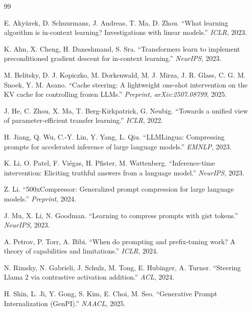 \documentclass[11pt]{article}
\theoremstyle{definition}
\begin{document}

\begin{thebibliography}{99}

E. Akyürek, D. Schuurmans, J. Andreas, T. Ma, D. Zhou.
``What learning algorithm is in-context learning? Investigations with linear models.''
\emph{ICLR}, 2023.

K. Ahn, X. Cheng, H. Daneshmand, S. Sra.
``Transformers learn to implement preconditioned gradient descent for in-context learning.''
\emph{NeurIPS}, 2023.

M. Belitsky, D. J. Kopiczko, M. Dorkenwald, M. J. Mirza, J. R. Glass, C. G. M. Snoek, Y. M. Asano.
``Cache steering: A lightweight one-shot intervention on the KV cache for controlling frozen LLMs.''
\emph{Preprint, arXiv:2507.08799}, 2025.

J. He, C. Zhou, X. Ma, T. Berg-Kirkpatrick, G. Neubig.
``Towards a unified view of parameter-efficient transfer learning.''
\emph{ICLR}, 2022.

H. Jiang, Q. Wu, C.-Y. Lin, Y. Yang, L. Qiu.
``LLMLingua: Compressing prompts for accelerated inference of large language models.''
\emph{EMNLP}, 2023.

K. Li, O. Patel, F. Viégas, H. Pfister, M. Wattenberg.
``Inference-time intervention: Eliciting truthful answers from a language model.''
\emph{NeurIPS}, 2023.

Z. Li.
``500xCompressor: Generalized prompt compression for large language models.''
\emph{Preprint}, 2024.

J. Mu, X. Li, N. Goodman.
``Learning to compress prompts with gist tokens.''
\emph{NeurIPS}, 2023.

A. Petrov, P. Torr, A. Bibi.
``When do prompting and prefix-tuning work? A theory of capabilities and limitations.''
\emph{ICLR}, 2024.

N. Rimsky, N. Gabrieli, J. Schulz, M. Tong, E. Hubinger, A. Turner.
``Steering Llama 2 via contrastive activation addition.''
\emph{ACL}, 2024.

H. Shin, L. Ji, Y. Gong, S. Kim, E. Choi, M. Seo.
``Generative Prompt Internalization (GenPI).''
\emph{NAACL}, 2025.


\end{thebibliography}
\end{document}
